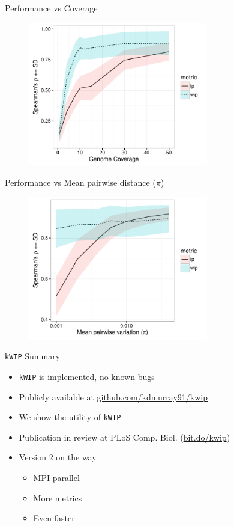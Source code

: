 \documentclass[t]{beamer}
\begin{document}
\begin{frame}{Performance vs Coverage}
  \begin{figure}
    \centering
    \includegraphics[width=0.7\textwidth]{img/coverage-vs-rho_50x.pdf}
  \end{figure}
\end{frame}

\begin{frame}{Performance vs Mean pairwise distance ($\pi$)}
  \begin{figure}
    \centering
    \includegraphics[width=0.7\textwidth]{img/pi-vs-performance.pdf}
  \end{figure}
\end{frame}

\begin{frame}{\texttt{kWIP} Summary}
  \begin{itemize}
    \item \texttt{kWIP} is implemented, no known bugs
    \item Publicly available at \url{github.com/kdmurray91/kwip}
    \item We show the utility of \texttt{kWIP}
    \item Publication in review at PLoS Comp. Biol. (\url{bit.do/kwip})
    \item Version 2 on the way
    \begin{itemize}
      \item MPI parallel
      \item More metrics
      \item Even faster
    \end{itemize}
  \end{itemize}
\end{frame}
\end{document}
